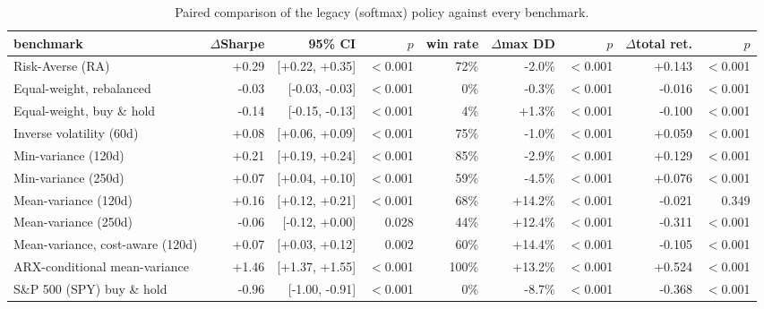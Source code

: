 \begin{table}[ht!]
\centering
\footnotesize
\setlength{\tabcolsep}{4pt}
\begin{tabular}{lrrrrrrrr}
\hline
benchmark & $\Delta$Sharpe & 95\% CI & $p$ & win rate & $\Delta$max DD & $p$ & $\Delta$total ret. & $p$ \\
\hline
Risk-Averse (RA) & +0.29 & [+0.22, +0.35] & $<$0.001 & 72\% & -2.0\% & $<$0.001 & +0.143 & $<$0.001 \\
Equal-weight, rebalanced & -0.03 & [-0.03, -0.03] & $<$0.001 & 0\% & -0.3\% & $<$0.001 & -0.016 & $<$0.001 \\
Equal-weight, buy \& hold & -0.14 & [-0.15, -0.13] & $<$0.001 & 4\% & +1.3\% & $<$0.001 & -0.100 & $<$0.001 \\
Inverse volatility (60d) & +0.08 & [+0.06, +0.09] & $<$0.001 & 75\% & -1.0\% & $<$0.001 & +0.059 & $<$0.001 \\
Min-variance (120d) & +0.21 & [+0.19, +0.24] & $<$0.001 & 85\% & -2.9\% & $<$0.001 & +0.129 & $<$0.001 \\
Min-variance (250d) & +0.07 & [+0.04, +0.10] & $<$0.001 & 59\% & -4.5\% & $<$0.001 & +0.076 & $<$0.001 \\
Mean-variance (120d) & +0.16 & [+0.12, +0.21] & $<$0.001 & 68\% & +14.2\% & $<$0.001 & -0.021 & 0.349 \\
Mean-variance (250d) & -0.06 & [-0.12, +0.00] & 0.028 & 44\% & +12.4\% & $<$0.001 & -0.311 & $<$0.001 \\
Mean-variance, cost-aware (120d) & +0.07 & [+0.03, +0.12] & 0.002 & 60\% & +14.4\% & $<$0.001 & -0.105 & $<$0.001 \\
ARX-conditional mean-variance & +1.46 & [+1.37, +1.55] & $<$0.001 & 100\% & +13.2\% & $<$0.001 & +0.524 & $<$0.001 \\
S\&P 500 (SPY) buy \& hold & -0.96 & [-1.00, -0.91] & $<$0.001 & 0\% & -8.7\% & $<$0.001 & -0.368 & $<$0.001 \\
\hline
\end{tabular}
\caption{Paired comparison of the legacy (softmax) policy against every benchmark.}
\label{tab:bench_paired_softmax}
\end{table}
